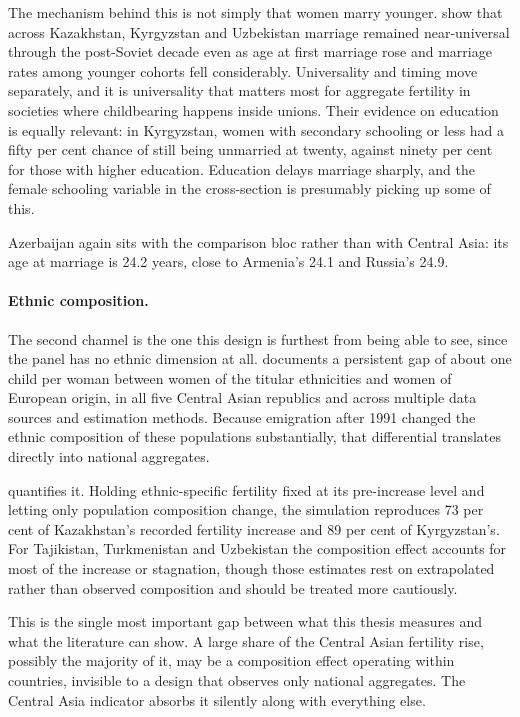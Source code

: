 The mechanism behind this is not simply that women marry younger. \textcite{dommaraju2008} show that across Kazakhstan, Kyrgyzstan and Uzbekistan marriage remained near-universal through the post-Soviet decade even as age at first marriage rose and marriage rates among younger cohorts fell considerably. Universality and timing move separately, and it is universality that matters most for aggregate fertility in societies where childbearing happens inside unions. Their evidence on education is equally relevant: in Kyrgyzstan, women with secondary schooling or less had a fifty per cent chance of still being unmarried at twenty, against ninety per cent for those with higher education. Education delays marriage sharply, and the female schooling variable in the cross-section is presumably picking up some of this.

Azerbaijan again sits with the comparison bloc rather than with Central Asia: its age at marriage is 24.2 years, close to Armenia's 24.1 and Russia's 24.9.

\paragraph{Ethnic composition.} The second channel is the one this design is furthest from being able to see, since the panel has no ethnic dimension at all. \textcite{spoorenberg2013} documents a persistent gap of about one child per woman between women of the titular ethnicities and women of European origin, in all five Central Asian republics and across multiple data sources and estimation methods. Because emigration after 1991 changed the ethnic composition of these populations substantially, that differential translates directly into national aggregates.

\textcite{spoorenberg2015} quantifies it. Holding ethnic-specific fertility fixed at its pre-increase level and letting only population composition change, the simulation reproduces 73 per cent of Kazakhstan's recorded fertility increase and 89 per cent of Kyrgyzstan's. For Tajikistan, Turkmenistan and Uzbekistan the composition effect accounts for most of the increase or stagnation, though those estimates rest on extrapolated rather than observed composition and should be treated more cautiously.

This is the single most important gap between what this thesis measures and what the literature can show. A large share of the Central Asian fertility rise, possibly the majority of it, may be a composition effect operating within countries, invisible to a design that observes only national aggregates. The Central Asia indicator absorbs it silently along with everything else.

